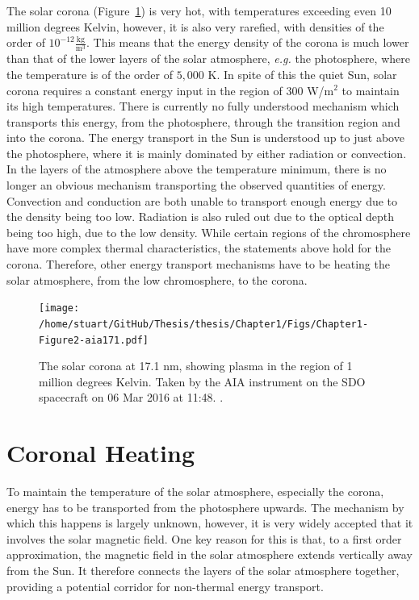 \documentclass[a4paper,12pt,fourier,authoryear,custommargin]{Classes/PhDThesisPSnPDF}
\begin{document}
The solar corona (Figure~\ref{fig:aia171}) is very hot, with temperatures exceeding even 10 million degrees Kelvin, however, it is also very rarefied, with densities of the order of $10^{-12}$$\frac{\text{kg}}{\text{m}^3}$.
This means that the energy density of the corona is much lower than that of the lower layers of the solar atmosphere, \textit{e.g.} the photosphere, where the temperature is of the order of $5,000$ K.
In spite of this the quiet Sun, solar corona requires a constant energy input in the region of $300$ W/m$^2$ \citep{priest2014} to maintain its high temperatures.
There is currently no fully understood mechanism which transports this energy, from the photosphere, through the transition region and into the corona. \citep{aschwanden2007,erdelyi2007,parnell2012}
The energy transport in the Sun is understood up to just above the photosphere, where it is mainly dominated by either radiation or convection.
In the layers of the atmosphere above the temperature minimum, there is no longer an obvious mechanism transporting the observed quantities of energy.
Convection and conduction are both unable to transport enough energy due to the density being too low.
Radiation is also ruled out due to the optical depth being too high, due to the low density.
While certain regions of the chromosphere have more complex thermal characteristics, the statements above hold for the corona.
Therefore, other energy transport mechanisms have to be heating the solar atmosphere, from the low chromosphere, to the corona.




\begin{figure}[h]
    \centering
    \texttt{[image: /home/stuart/GitHub/Thesis/thesis/Chapter1/Figs/Chapter1-Figure2-aia171.pdf]}
    \caption{The solar corona at 17.1 nm, showing plasma in the region of 1 million degrees Kelvin. Taken by the AIA instrument on the SDO spacecraft on 06 Mar 2016 at 11:48. \citep{pesnell2012,thesunpycommunity2015a}.}
    \label{fig:aia171}
\end{figure}


\section{Coronal Heating}

To maintain the temperature of the solar atmosphere, especially the corona, energy has to be transported from the photosphere upwards.
The mechanism by which this happens is largely unknown, however, it is very widely accepted that it involves the solar magnetic field.
One key reason for this is that, to a first order approximation, the magnetic field in the solar atmosphere extends vertically away from the Sun.
It therefore connects the layers of the solar atmosphere together, providing a potential corridor for non-thermal energy transport.
\end{document}
